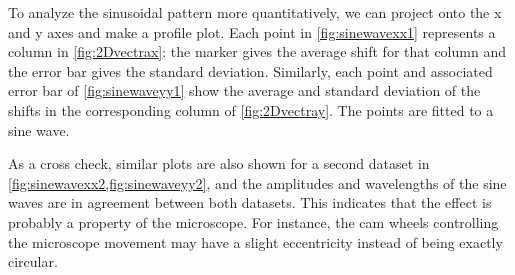 \documentclass{article}
\begin{document}
To analyze the sinusoidal pattern more quantitatively, we can project onto the x and y axes and make a profile plot.  Each point in \cref{fig:sinewavexx1} represents a column in \cref{fig:2Dvectrax}: the marker gives the average shift for that column and the error bar gives the standard deviation.  Similarly, each point and associated error bar of \cref{fig:sinewaveyy1} show the average and standard deviation of the shifts in the corresponding column of \cref{fig:2Dvectray}.  The points are fitted to a sine wave.

As a cross check, similar plots are also shown for a second dataset in \cref{fig:sinewavexx2,fig:sinewaveyy2}, and the amplitudes and wavelengths of the sine waves are in agreement between both datasets.  This indicates that the effect is probably a property of the microscope.  For instance, the cam wheels controlling the microscope movement may have a slight eccentricity instead of being exactly circular.
\end{document}
